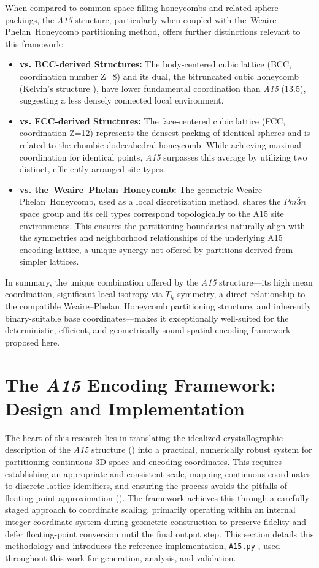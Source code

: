 \documentclass[10pt]{article}
\def\AAAB{\textit{A15}}
\def\WP{Weaire--Phelan}
\def\WPH{\WP{}~Honeycomb}
\def\tWPH{the~\WP{}~Honeycomb}
\begin{document}
When compared to common space-filling honeycombs and related sphere packings, the \AAAB{} structure, particularly when coupled with \tWPH{} partitioning method, offers further distinctions relevant to this framework:
\begin{itemize} \itemsep0pt
    \item \textbf{vs. BCC-derived Structures:} The body-centered cubic lattice (BCC, coordination number Z=8) and its dual, the bitruncated cubic honeycomb (Kelvin's structure \cite{Kelvin1887}), have lower fundamental coordination than \AAAB{} (13.5), suggesting a less densely connected local environment.
    \item \textbf{vs. FCC-derived Structures:} The face-centered cubic lattice (FCC, coordination Z=12) represents the densest packing of identical spheres \cite{ConwaySloane1999} and is related to the rhombic dodecahedral honeycomb. While achieving maximal coordination for identical points, \AAAB{} surpasses this average by utilizing two distinct, efficiently arranged site types.
    \item \textbf{vs. \tWPH{}:} The geometric \WPH{}, used as a local discretization method, shares the $Pm\bar{3}n$ space group and its cell types correspond topologically to the A15 site environments. This ensures the partitioning boundaries naturally align with the symmetries and neighborhood relationships of the underlying A15 encoding lattice, a unique synergy not offered by partitions derived from simpler lattices.
\end{itemize}
In summary, the unique combination offered by the \AAAB{} structure—its high mean coordination, significant local isotropy via $T_h$ symmetry, a direct relationship to the compatible \WPH{} partitioning structure, and inherently binary-suitable base coordinates—makes it exceptionally well-suited for the deterministic, efficient, and geometrically sound spatial encoding framework proposed here.

\section{The \AAAB{} Encoding Framework: Design and Implementation}\label{sec:framework-design}

The heart of this research lies in translating the idealized crystallographic description of the \AAAB{} structure () into a practical, numerically robust system for partitioning continuous 3D space and encoding coordinates. This requires establishing an appropriate and consistent scale, mapping continuous coordinates to discrete lattice identifiers, and ensuring the process avoids the pitfalls of floating-point approximation (). The framework achieves this through a carefully staged approach to coordinate scaling, primarily operating within an internal integer coordinate system during geometric construction to preserve fidelity and defer floating-point conversion until the final output step. This section details this methodology and introduces the reference implementation, \texttt{A15.py} \cite{Risinger2024A15}, used throughout this work for generation, analysis, and validation.
\end{document}
